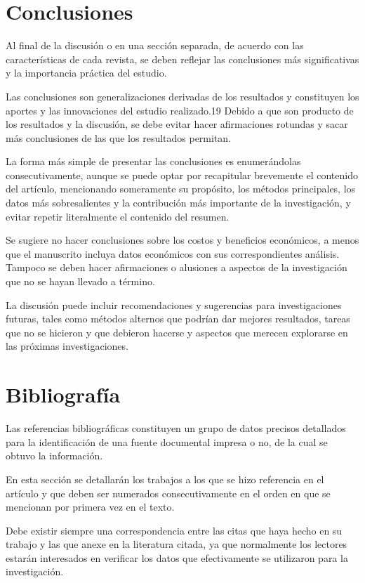 \documentclass[%
 reprint,
groupedaddress,
unsortedaddress,
 amsmath,amssymb,
 aps,
superscriptaddress
]{revtex4-2}
\begin{document}
\section{Conclusiones}
\label{Sec:Concl}
Al final de la discusión o en una sección separada, de acuerdo con las características de 
cada revista, se deben reflejar las conclusiones más significativas y la importancia 
práctica del estudio.

Las conclusiones son generalizaciones derivadas de los resultados y constituyen los 
aportes y las innovaciones del estudio realizado.19 Debido a que son producto de los 
resultados y la discusión, se debe evitar hacer afirmaciones rotundas y sacar más 
conclusiones de las que los resultados permitan.

La forma más simple de presentar las conclusiones es enumerándolas consecutivamente, 
aunque se puede optar por recapitular brevemente el contenido del artículo, mencionando 
someramente su propósito, los métodos principales, los datos más sobresalientes y la 
contribución más importante de la investigación, y evitar repetir literalmente el 
contenido del resumen.

Se sugiere no hacer conclusiones sobre los costos y beneficios económicos, a menos que el 
manuscrito incluya datos económicos con sus correspondientes análisis. Tampoco se deben 
hacer afirmaciones o alusiones a aspectos de la investigación que no se hayan llevado a 
término. 

La discusión puede incluir recomendaciones y sugerencias para investigaciones futuras, 
tales como métodos alternos que podrían dar mejores resultados, tareas que no se hicieron 
y que debieron hacerse y aspectos que merecen explorarse en las próximas investigaciones.

\section{Bibliografía}

Las referencias bibliográficas constituyen un grupo de datos precisos detallados para la 
identificación de una fuente documental impresa o no, de la cual se obtuvo la información.

En esta sección se detallarán los trabajos a los que se hizo referencia en el artículo y 
que deben ser numerados consecutivamente en el orden en que se mencionan por primera vez 
en el texto.

Debe existir siempre una correspondencia entre las citas que haya hecho en su trabajo y 
las que anexe en la literatura citada, ya que normalmente los lectores estarán 
interesados en verificar los datos que efectivamente se utilizaron para la investigación.
\end{document}
